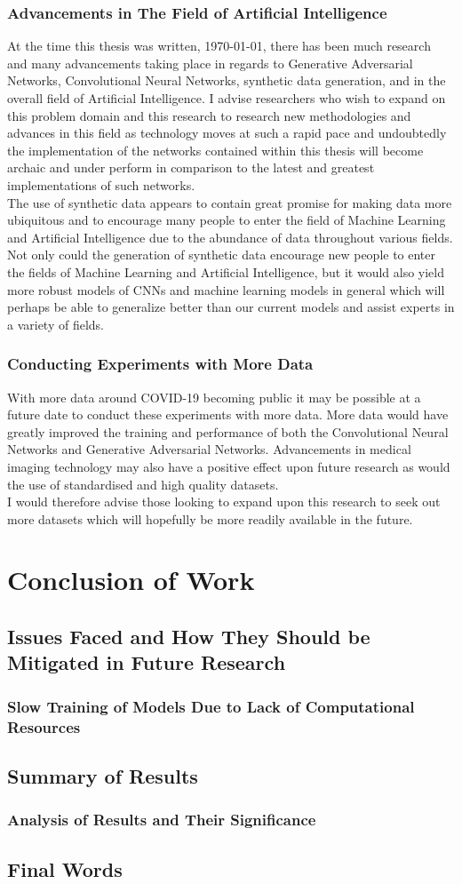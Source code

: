 \subsubsection{Advancements in The Field of Artificial Intelligence}
At the time this thesis was written, \today, there has been much research and many advancements taking place in regards to Generative Adversarial Networks, Convolutional Neural Networks, synthetic data generation, and in the overall field of Artificial Intelligence.  I advise researchers who wish to expand on this problem domain and this research to research new methodologies and advances in this field as technology moves at such a rapid pace and undoubtedly the implementation of the networks contained within this thesis will become archaic and under perform in comparison to the latest and greatest implementations of such networks.
\\
The use of synthetic data appears to contain great promise for making data more ubiquitous and to encourage many people to enter the field of Machine Learning and Artificial Intelligence due to the abundance of data throughout various fields.  Not only could the generation of synthetic data encourage new people to enter the fields of Machine Learning and Artificial Intelligence, but it would also yield more robust models of CNNs and machine learning models in general which will perhaps be able to generalize better than our current models and assist experts in a variety of fields.
\subsubsection{Conducting Experiments with More Data}
With more data around COVID-19 becoming public it may be possible at a future date to conduct these experiments with more data.  More data would have greatly improved the training and performance of both the Convolutional Neural Networks and Generative Adversarial Networks.  Advancements in medical imaging technology may also have a positive effect upon future research as would the use of standardised and high quality datasets.  
\\
I would therefore advise those looking to expand upon this research to seek out more datasets which will hopefully be more readily available in the future. 
\section{Conclusion of Work}
\subsection{Issues Faced and How They Should be Mitigated in Future Research}
\subsubsection{Slow Training of Models Due to Lack of Computational Resources}
\subsection{Summary of Results}
\subsubsection{Analysis of Results and Their Significance}
\subsection{Final Words}